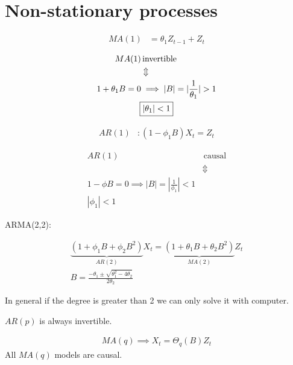 \section{Non-stationary processes}

\begin{align*}
	MA(1) & = \theta_1 Z_{t-1} + Z_t
\end{align*}

\begin{align*}
	MA(1)              & \,\text{invertible}                     \\
	                   & \Updownarrow                            \\
	1 + \theta_1 B = 0 & \implies |B| = |\frac{1}{\theta_1}| > 1 \\
	\span\boxed{|\theta_1| < 1}
\end{align*}

\begin{align*}
	AR(1) & : (1 -\phi_1 B) X_t = Z_t
\end{align*}

\begin{align*}
	AR(1) & \,\text{causal}                              \\
	      & \Updownarrow                                 \\
	1 - \phi B = 0 \implies |B| = |\frac{1}{\phi_1}| < 1 \\
	\boxed{|\phi_1| < 1}
\end{align*}

ARMA(2,2):

\begin{align*}
	\underbrace{(1 + \phi_1B + \phi_2B^2)}_{AR(2)}
	X_t
	=
	\underbrace{(1 + \theta_1B + \theta_2B^2)}_{MA(2)}
	Z_t \\
	B = \frac{
		-\theta_1 \pm \sqrt{\theta_1^2 - 4\theta_2}
	}{
		2\theta_2
	}
\end{align*}

\begin{note}
	In general if the degree is greater than 2 we
	can only solve it with computer.
\end{note}

\begin{note}
	$AR(p)$ is always invertible.
\end{note}

\begin{note}
	\begin{align*}
		MA(q) \implies X_t = \Theta_q(B) Z_t
	\end{align*}
	All $MA(q)$ models are causal.
\end{note}

